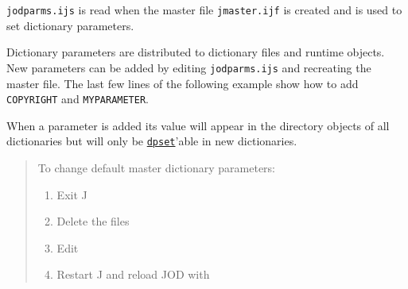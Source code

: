 \verb|jodparms.ijs| is read when the master file \verb|jmaster.ijf| is created
and is used to set dictionary parameters.

Dictionary parameters are distributed to dictionary files and runtime
objects. New parameters can be added by editing \verb|jodparms.ijs|
and recreating the master file.
The last few lines of the following example show how to add
\texttt{COPYRIGHT} and \texttt{MYPARAMETER}. 

When a parameter is added its value will appear in the directory
objects of all dictionaries but will only be \hyperlink{il:dpset}{\texttt{dpset}}'able in new dictionaries.

\begin{quotation}
	To change default master dictionary parameters:
	\begin{enumerate}
	  \item Exit J
		\item Delete the files
		\item Edit 
		\item Restart J and reload JOD with 
	 \end{enumerate}
\end{quotation}


